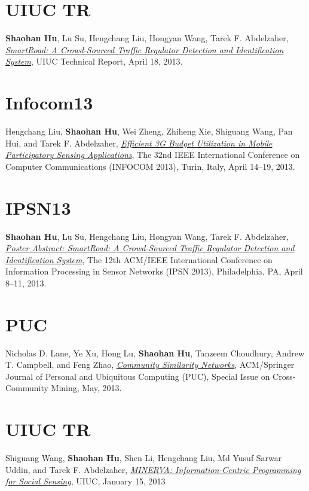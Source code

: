\section{\sc UIUC TR}\hypertarget{hu2013uiuc1}{}
\textbf{Shaohan Hu}, Lu Su, Hengchang Liu, Hongyan Wang, Tarek F.
Abdelzaher, \href{https://www.ideals.illinois.edu/handle/2142/43856}{\emph{SmartRoad: A Crowd-Sourced Traffic Regulator
  Detection and Identification System}}, \textsf{UIUC Technical
  Report}, April 18, 2013.

\section{\sc Infocom13}\hypertarget{liu2013infocom}{}
Hengchang Liu, \textbf{Shaohan Hu}, Wei Zheng, Zhiheng Xie, Shiguang
Wang, Pan Hui, and Tarek F. Abdelzaher, \href{http://ieeexplore.ieee.org/xpl/articleDetails.jsp?arnumber=6566935}{\emph{Efficient 3G Budget
  Utilization in Mobile Participatory Sensing Applications}},
\textsf{The 32nd IEEE International Conference on Computer
  Communications (INFOCOM 2013)}, Turin, Italy, April 14--19, 2013.

\section{\sc IPSN13}\hypertarget{hu2013ipsn}{}
\textbf{Shaohan Hu}, Lu Su, Hengchang Liu, Hongyan Wang, Tarek F.
Abdelzaher, \href{http://portal.acm.org/citation.cfm?id=2461433}{\emph{Poster Abstract: SmartRoad: A Crowd-Sourced Traffic
  Regulator Detection and Identification System}}, \textsf{The 12th
  ACM/IEEE International Conference on Information Processing in
  Sensor Networks (IPSN 2013)}, Philadelphia, PA, April 8--11, 2013.

\section{\sc PUC}\hypertarget{lane2013puc}{}
Nicholas D. Lane, Ye Xu, Hong Lu, \textbf{Shaohan Hu}, Tanzeem
Choudhury, Andrew T. Campbell, and Feng Zhao, \href{http://link.springer.com/article/10.1007/s00779-013-0655-1}{\emph{Community Similarity Networks}}, \textsf{ACM/Springer Journal of Personal
  and Ubiquitous Computing (PUC), Special Issue on Cross-Community
  Mining}, May, 2013.

\section{\sc UIUC TR}\hypertarget{wang2013uiuc}{}
Shiguang Wang, \textbf{Shaohan Hu}, Shen Li, Hengchang Liu, Md Yusuf
Sarwar Uddin, and Tarek F. Abdelzaher, \href{https://www.ideals.illinois.edu/handle/2142/42511}{\emph{MINERVA: Information-Centric
  Programming for Social Sensing}}, \textsf{UIUC}, January 15, 2013


